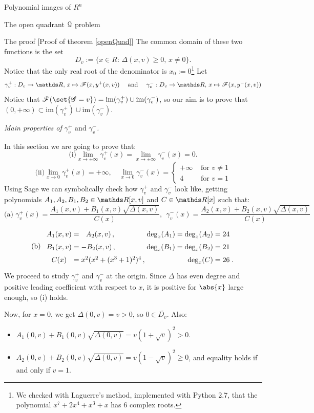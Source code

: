 \documentclass[11pt, a4paper, english, twoside, notitlepage, openright]{report}
\begin{document}
\begin{chapter}{Polynomial images of $R^n$}
\begin{section}{The open quadrant $\mathcal{Q}$ problem}
\begin{subsection}{The proof} [Proof of theorem \ref{openQuad}]
The common domain of these two functions is the set 
$$
D_v:=\{x\in R:\, \Delta(x,v)\geq 0,\,x\neq 0\}.
$$ 
Notice that the only real root of the denominator is $x_0:=0$\footnote{We checked with Laguerre's method, implemented with Python 2.7, that the polynomial $x^7+2x^4+x^3+x$ has 6 complex roots.} Let
$$
\gamma_v^+: D_v\to\R,\, x\mapsto\F(x,y^+(x,v))\quad\text{ and }\quad\gamma_v^-:D_v\to\R,\, x\mapsto\F(x,y^-(x,v))
$$
Notice that $\F(\set{\G=v})=\text{im}(\gamma_v^+)\cup\text{im}(\gamma_v^-)$, so our aim is to prove that $(0,+\infty)\subset\text{im}(\gamma_v^+)\cup\text{im}(\gamma_v^-)$.
\begin{center}
 \emph{Main properties of $\gamma_v^+ \text{ and } \gamma_v^-$.}
\end{center}\label{step2}
In this section we are going to prove that:
$$
\text{(i)} \lim_{x\rightarrow \pm\infty}\gamma_v^+(x)=\lim_{x\rightarrow \pm\infty}\gamma_v^-(x)=0.
$$
$$\text{(ii)} \lim_{x\rightarrow 0}\gamma_v^+(x)=+\infty
,\quad \lim_{x\rightarrow 0}\gamma_v^-(x)=\left\{\begin{array}{ll}
+\infty&\text{ for $v\neq 1$}\\
 4 & \text{ for $v=1$}
\end{array} \right.
$$
Using Sage we can symbolically check how $\gamma_v^+\text{ and }\gamma_v^-$ look like, getting polynomials $A_1,A_2,B_1,B_2\in\R[x,v]$ and $C\in \R[x]$ such that:
$$\text{(a) }\gamma_v^+(x)=\dfrac{A_1(x,v)+B_1(x,v)\sqrt{\Delta(x,v)}}{C(x)}, \ \ 
\gamma_v^-(x)=\dfrac{A_2(x,v)+B_2(x,v)\sqrt{\Delta(x,v)}}{C(x)}$$
$$
\text{(b)}\ \ 
\arraycolsep=1.4pt\def\arraystretch{1.5}
\begin{array}{cclrl}
A_1(x,v)&=&\ \ A_2(x,v)\, , & \text{deg}_x(A_1)=\text{deg}_x(A_2)=24& \\
B_1(x,v)&=&-B_2(x,v)\, , &\text{deg}_x(B_1)=\text{deg}_x(B_2)=21& \\
C(x)&=&x^2(x^2+(x^3+1)^2)^4\, , & \text{deg}_x(C)=26&.
\end{array}
$$
We proceed to study $\gamma_v^+$ and $\gamma_v^-$ at the origin. Since $\Delta$ has even degree and positive leading coefficient with respect to $x$, it is positive for $\abs{x}$ large enough, so (i) holds.
			
Now, for $x=0$, we get $\Delta(0,v)=v>0$, so $0\in\overline{D_v}$. Also:
\begin{itemize}
\item $A_1(0,v)+B_1(0,v) \sqrt{\Delta(0,v)}= v(1+\sqrt{v})^2>0$.
				\item $A_2(0,v)+B_2(0,v)\sqrt{\Delta(0,v)}=v(1-\sqrt{v})^2\geq 0$, and equality holds if and only if $v=1$.
\end{itemize}
			

\end{subsection}
\end{section}
\end{chapter}
\end{document}
